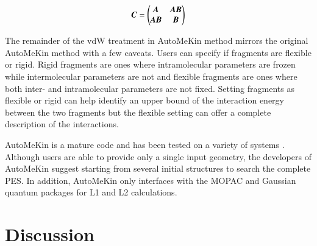 \documentclass[preprint, 11pt]{elsarticle} %
\begin{document}
\begin{equation}
    \textbf{\textit{C}} = \begin{pmatrix}
\textbf{\textit{A}} & \textbf{\textit{AB}} \\
\textbf{\textit{AB}} & \textbf{\textit{B}}
\end{pmatrix}
\label{eq:C}
\end{equation}

The remainder of the vdW treatment in AutoMeKin method mirrors the original AutoMeKin method with a few caveats.
Users can specify if fragments are flexible or rigid.
Rigid fragments are ones where intramolecular parameters are frozen while intermolecular parameters are not and flexible fragments are ones where both inter- and intramolecular parameters are not fixed. 
Setting fragments as flexible or rigid can help identify an upper bound of the interaction energy between the two fragments but the flexible setting can offer a complete description of the interactions.

AutoMeKin is a mature code and has been tested on a variety of systems \cite{Martinez:2015,Martinez:2015jccp,rodriguez:201,Kopec:2019}.
Although users are able to provide only a single input geometry, the developers of AutoMeKin suggest starting from several initial structures to search the complete PES.
In addition, AutoMeKin only interfaces with the MOPAC and Gaussian quantum packages for L1 and L2 calculations.





\section{Discussion}
%
\end{document}
